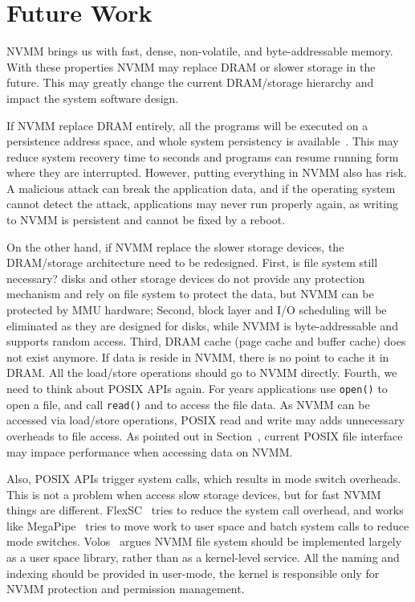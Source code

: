 \section{Future Work} 
\label{sec:future}

NVMM brings us with fast, dense,
non-volatile, and byte-addressable memory. With these properties NVMM may
replace DRAM or slower storage in the future.
This may greatly change the current DRAM/storage
hierarchy and impact the system software design.

If NVMM replace DRAM entirely, all the programs will be executed on a
persistence address space, and whole system persistency is available~\cite{WSP}.
This may reduce system recovery time to seconds and programs can resume
running form where they are interrupted. However, putting everything in
NVMM also has risk. A malicious attack can break the application data, and if
the operating system cannot detect the attack, applications may never run
properly again, as writing to NVMM is persistent and cannot be fixed by a reboot. 

On the other hand, if NVMM replace the slower storage devices, the DRAM/storage
architecture need to be redesigned. First, is file system still necessary?
disks and other storage devices do not provide any
protection mechanism and rely on file system to protect the data, but NVMM
can be protected by MMU hardware; Second, block layer and I/O scheduling
will be eliminated as they are designed for disks,
while NVMM is byte-addressable and supports random access.
Third, DRAM cache (page cache and buffer cache) does not exist anymore. If data
is reside in NVMM, there is no point to cache it in DRAM. All the load/store
operations should go to NVMM directly.
Fourth, we need to think about POSIX APIs again. For years applications use
\texttt{open()} to open a file, and call \texttt{read()} and  to
access the file data. As NVMM can be accessed via load/store operations, 
POSIX read and write may adds unnecessary overheads to file access.
 As pointed out in Section~, current POSIX file 
interface may impace performance when accessing data on NVMM.

Also, POSIX APIs trigger system calls, which results in mode switch overheads.
This is not a problem when access slow storage devices, but for fast NVMM things
are different.
FlexSC~\cite{FlexSC} tries to reduce the system call overhead,
and works like MegaPipe~\cite{MegaPipe} tries to move work to user space and
batch system calls to reduce mode switches. Volos~\cite{system-scm} argues
NVMM file system should be implemented largely as a user space library, rather
than as a kernel-level service. All the naming and indexing should be provided
in user-mode, the kernel is responsible only for NVMM protection and permission
management.

